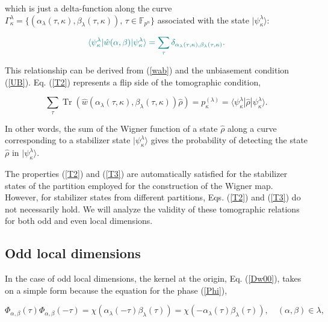 \documentclass[quantumrep,article,submit,pdftex,moreauthors]{Definitions/mdpi}
\DeclareMathOperator{\Tr}{Tr}
\begin{document}
{\color{teal}which is just a delta-function along the curve
$\Gamma_{\kappa}^{\lambda} = \{(\alpha_{\lambda
}(\tau,\kappa),\beta_{\lambda}(\tau,\kappa)),\,\tau \in \mathbb F_{p^{n}}\}$
associated with the state $|\psi_{\kappa }^{\lambda }\rangle$:}

\begin{equation}
  \color{teal}
  \langle \psi_{\kappa}^{\lambda}
  |\hat{w}\left( \alpha,\beta \right)
  |\psi_{\kappa }^{\lambda}
  \rangle = \sum_{\tau} \delta_{\alpha_{\lambda}(\tau,\kappa),
  \beta_{\lambda}(\tau ,\kappa )}.
  \label{T2}
\end{equation}

This relationship can be derived from (\ref{wab}) and the unbiasement condition
(\ref{UB}). Eq. (\ref{T2}) represents a flip side of the tomographic condition,

\begin{equation}
  \sum_{\tau } \Tr\left(
    \hat{w}\left(
      \alpha_{\lambda}(\tau,\kappa),\beta_{\lambda}(\tau,\kappa)
    \right) \hat{\rho}
  \right)
  = p_{\kappa}^{(\lambda)}
  = \langle \psi_{\kappa}^{\lambda} |\hat{\rho}|\psi_{\kappa}^{\lambda}\rangle.
  \label{T3}
\end{equation}

In other words, the sum of the Wigner function of a state $\hat{\rho}$ along a
curve corresponding to a stabilizer state $|\psi _{\kappa }^{\lambda }\rangle$
gives the probability of detecting the state $\hat{\rho}$ in $|\psi_{\kappa
}^{\lambda}\rangle$.

The properties (\ref{T2}) and (\ref{T3}) are automatically satisfied for the
stabilizer states of the partition employed for the construction of the Wigner
map. However, for stabilizer states from different partitions, Eqs. (\ref{T2})
and (\ref{T3}) do not necessarily hold. We will analyze the validity of these
tomographic relations for both odd and even local dimensions.

\subsection{Odd local dimensions}

In the case of odd local dimensions, the kernel at the origin, Eq. (\ref{Dw00}),
takes on a simple form because the equation for the phase (\ref{Phi}), 

\begin{equation*}
  \Phi_{\alpha,\beta} (\tau) \Phi_{\alpha,\beta}(-\tau)
  = \chi\left(\alpha_{\lambda}(-\tau)\beta_{\lambda}(\tau)\right)
  = \chi\left(-\alpha_{\lambda}(\tau)\beta_{\lambda}(\tau)\right),
  \quad (\alpha,\beta) \in \lambda,
\end{equation*}
\end{document}
